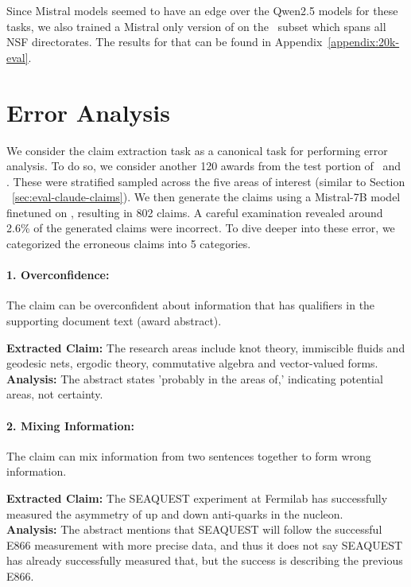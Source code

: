 \documentclass[11pt]{article}
\begin{document}
Since Mistral models seemed to have an edge over the Qwen2.5 models for these tasks, we also trained a Mistral only version of on the \DatasetNameTwentyK~subset which spans all NSF directorates. The results for that can be found in Appendix~\ref{appendix:20k-eval}.

\section{Error Analysis}
\label{sec:error-analysis}
We consider the claim extraction task as a canonical task for performing error analysis. To do so, we consider another 120 awards from the test portion of \DatasetNameMatSci~and \DatasetNameTwentyK. These were stratified sampled across the five areas of interest (similar to Section ~\ref{sec:eval-claude-claims}). We then generate the claims using a Mistral-7B model finetuned on \DatasetNameTwentyK, resulting in 802 claims. A careful examination revealed around 2.6\% of the generated claims were incorrect. To dive deeper into these error, we categorized the erroneous claims into 5 categories.

\paragraph{1. Overconfidence: }
The claim can be overconfident about information that has qualifiers in the supporting document text (award abstract).

{\small
\begin{tcolorbox}[title={\textbf{Award ID:} 9820570}]
\textbf{Extracted Claim:} The research areas include knot theory, immiscible fluids and geodesic nets, ergodic theory, commutative algebra and vector-valued forms.\\
\textbf{Analysis:} The abstract states 'probably in the areas of,' indicating potential areas, not certainty.
\end{tcolorbox}
}

\paragraph{2. Mixing Information:}
The claim can mix information from two sentences together to form wrong information.

{\small
\begin{tcolorbox}[title={\textbf{Award ID:} 1205671}]
\textbf{Extracted Claim:} The SEAQUEST experiment at Fermilab has successfully measured the asymmetry of up and down anti-quarks in the nucleon.\\
\textbf{Analysis:} The abstract mentions that SEAQUEST will follow the successful E866 measurement with more precise data, and thus it does not say SEAQUEST has already successfully measured that, but the success is describing the previous E866.
\end{tcolorbox}
}
\end{document}
